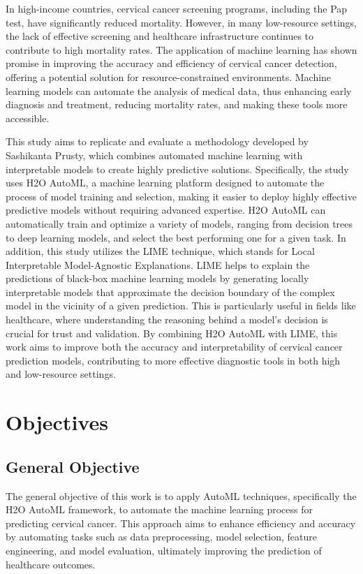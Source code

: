 \documentclass{llncs}
\begin{document}
In high-income countries, cervical cancer screening programs, including the Pap test, have significantly reduced mortality. However, in many low-resource settings, the lack of effective screening and healthcare infrastructure continues to contribute to high mortality rates. The application of machine learning has shown promise in improving the accuracy and efficiency of cervical cancer detection, offering a potential solution for resource-constrained environments. Machine learning models can automate the analysis of medical data, thus enhancing early diagnosis and treatment, reducing mortality rates, and making these tools more accessible. 

This study aims to replicate and evaluate a methodology developed by Sashikanta Prusty, which combines automated machine learning with interpretable models to create highly predictive solutions. Specifically, the study uses H2O AutoML, a machine learning platform designed to automate the process of model training and selection, making it easier to deploy highly effective predictive models without requiring advanced expertise. H2O AutoML can automatically train and optimize a variety of models, ranging from decision trees to deep learning models, and select the best performing one for a given task. In addition, this study utilizes the LIME technique, which stands for Local Interpretable Model-Agnostic Explanations. LIME helps to explain the predictions of black-box machine learning models by generating locally interpretable models that approximate the decision boundary of the complex model in the vicinity of a given prediction. This is particularly useful in fields like healthcare, where understanding the reasoning behind a model's decision is crucial for trust and validation. By combining H2O AutoML with LIME, this work aims to improve both the accuracy and interpretability of cervical cancer prediction models, contributing to more effective diagnostic tools in both high and low-resource settings.

\section{Objectives}

\subsection{General Objective}
The general objective of this work is to apply AutoML techniques, specifically the H2O AutoML framework, to automate the machine learning process for predicting cervical cancer. This approach aims to enhance efficiency and accuracy by automating tasks such as data preprocessing, model selection, feature engineering, and model evaluation, ultimately improving the prediction of healthcare outcomes.
\end{document}
